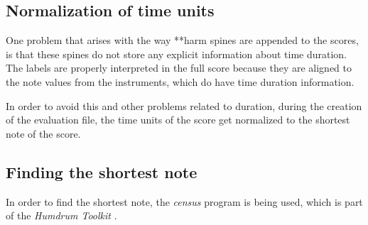   \subsection{Normalization of time units}

		One problem that arises with the way **harm spines are appended to the scores, is that these spines do not store any explicit information about time duration. The labels are properly interpreted in the full score because they are aligned to the note values from the instruments, which do have time duration information.

		In order to avoid this and other problems related to duration, during the creation of the evaluation file, the time units of the score get normalized to the shortest note of the score.

	\subsection{Finding the shortest note}
		In order to find the shortest note, the \emph{census} program is being used, which is part of the \emph{Humdrum Toolkit} \cite{humdrum}.

